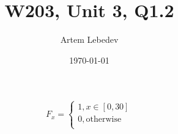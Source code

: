 \documentclass{article}
\author{Artem Lebedev}
\title{W203, Unit 3, Q1.2}
\date{\today}
\begin{document}
\maketitle

\begin{equation}
  F_{x} =
    \begin{cases}
      1, x\in [0, 30]\\
      0, \text{otherwise}\\
    \end{cases}       
\end{equation}
\end{document}
